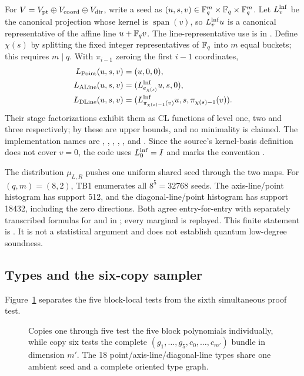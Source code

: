 For \(V=V_{\rm pt}\oplus V_{\rm coord}\oplus V_{\rm dir}\), write a seed as
\((u,s,v)\in\mathbb F_q^m\times\mathbb F_q\times\mathbb F_q^m\).  Let
\(L_v^{\rm lnf}\) be the canonical projection whose kernel is
\(\operatorname{span}(v)\), so \(L_v^{\rm lnf}u\) is a canonical representative
of the affine line \(u+\mathbb F_qv\).
The line-representative use is  in
.  Define \(\chi(s)\) by splitting the fixed
integer representatives of \(\mathbb F_q\) into \(m\) equal buckets; this requires
\(m\mid q\).  With \(\pi_{i-1}\) zeroing the first \(i-1\) coordinates,
\[
\begin{aligned}
L_{\rm Point}(u,s,v)&=(u,0,0),\\
L_{\rm ALine}(u,s,v)&=(L_{e_{\chi(s)}}^{\rm lnf}u,s,0),\\
L_{\rm DLine}(u,s,v)&=(L_{\pi_{\chi(s)-1}(v)}^{\rm lnf}u,
                         s,\pi_{\chi(s)-1}(v)).
\end{aligned}
\]
Their stage factorizations exhibit them as CL functions of level one, two and
three respectively; by  these are upper bounds, and no
minimality is claimed.
The implementation names are , ,
, , , and .  Since the
source's kernel-basis definition does not cover \(v=0\), the code uses
\(L_0^{\rm lnf}=I\) and marks the convention .

The distribution \(\mu_{L,R}\) pushes one uniform shared seed through the two
maps.
For \((q,m)=(8,2)\), TB1 enumerates all \(8^5=32768\) seeds.  The
axis-line/point histogram has support 512, and the diagonal-line/point
histogram has support 18432, including the zero directions.  Both agree
entry-for-entry with separately transcribed formulas for
 and  in
; every marginal is replayed.  This finite
statement is .  It is not a statistical argument and does
not establish quantum low-degree soundness.

\subsection{Types and the six-copy sampler}

Figure~\ref{fig:six-copy-sampler} separates the five block-local tests from
the sixth simultaneous proof test.
\begin{figure}[H]
\centering

\caption{Copies one through five test the five block polynomials individually, while copy six tests the complete \((g_1,\ldots,g_5,c_0,\ldots,c_{m'})\) bundle in dimension \(m'\).  The 18 point/axis-line/diagonal-line types share one ambient seed and a complete oriented type graph.}
\label{fig:six-copy-sampler}
\end{figure}

